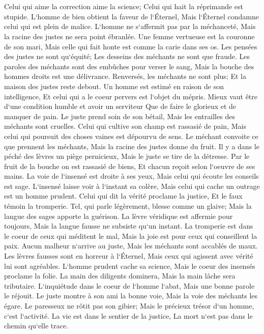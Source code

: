 \chapter{}

\verse Celui qui aime la correction aime la science; Celui qui hait la réprimande est stupide. 
\verse L`homme de bien obtient la faveur de l`Éternel, Mais l`Éternel condamne celui qui est plein de malice. 
\verse L`homme ne s`affermit pas par la méchanceté, Mais la racine des justes ne sera point ébranlée. 
\verse Une femme vertueuse est la couronne de son mari, Mais celle qui fait honte est comme la carie dans ses os. 
\verse Les pensées des justes ne sont qu`équité; Les desseins des méchants ne sont que fraude. 
\verse Les paroles des méchants sont des embûches pour verser le sang, Mais la bouche des hommes droits est une délivrance. 
\verse Renversés, les méchants ne sont plus; Et la maison des justes reste debout. 
\verse Un homme est estimé en raison de son intelligence, Et celui qui a le coeur pervers est l`objet du mépris. 
\verse Mieux vaut être d`une condition humble et avoir un serviteur Que de faire le glorieux et de manquer de pain. 
\verse Le juste prend soin de son bétail, Mais les entrailles des méchants sont cruelles. 
\verse Celui qui cultive son champ est rassasié de pain, Mais celui qui poursuit des choses vaines est dépourvu de sens. 
\verse Le méchant convoite ce que prennent les méchants, Mais la racine des justes donne du fruit. 
\verse Il y a dans le péché des lèvres un piège pernicieux, Mais le juste se tire de la détresse. 
\verse Par le fruit de la bouche on est rassasié de biens, Et chacun reçoit selon l`oeuvre de ses mains. 
\verse La voie de l`insensé est droite à ses yeux, Mais celui qui écoute les conseils est sage. 
\verse L`insensé laisse voir à l`instant sa colère, Mais celui qui cache un outrage est un homme prudent. 
\verse Celui qui dit la vérité proclame la justice, Et le faux témoin la tromperie. 
\verse Tel, qui parle légèrement, blesse comme un glaive; Mais la langue des sages apporte la guérison. 
\verse La lèvre véridique est affermie pour toujours, Mais la langue fausse ne subsiste qu`un instant. 
\verse La tromperie est dans le coeur de ceux qui méditent le mal, Mais la joie est pour ceux qui conseillent la paix. 
\verse Aucun malheur n`arrive au juste, Mais les méchants sont accablés de maux. 
\verse Les lèvres fausses sont en horreur à l`Éternel, Mais ceux qui agissent avec vérité lui sont agréables. 
\verse L`homme prudent cache sa science, Mais le coeur des insensés proclame la folie. 
\verse La main des diligents dominera, Mais la main lâche sera tributaire. 
\verse L`inquiétude dans le coeur de l`homme l`abat, Mais une bonne parole le réjouit. 
\verse Le juste montre à son ami la bonne voie, Mais la voie des méchants les égare. 
\verse Le paresseux ne rôtit pas son gibier; Mais le précieux trésor d`un homme, c`est l`activité. 
\verse La vie est dans le sentier de la justice, La mort n`est pas dans le chemin qu`elle trace. 

